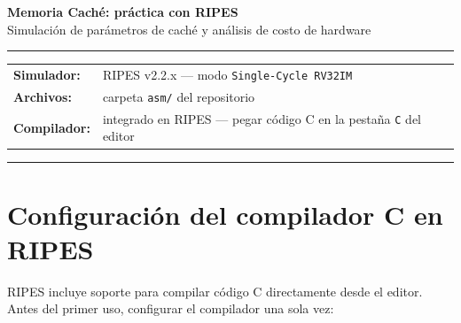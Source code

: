 \documentclass[12pt, a4paper]{article}
\begin{document}

\begin{center}
    {\LARGE\bfseries Memoria Caché: práctica con RIPES}\\[0.4cm]
    {\large Simulación de parámetros de caché y análisis de costo de hardware}\\[0.2cm]
    \rule{\textwidth}{1pt}
\end{center}

\vspace{0.3cm}
\begin{tabular}{ll}
    \textbf{Simulador:}   & RIPES v2.2.x — modo \texttt{Single-Cycle RV32IM} \\
    \textbf{Archivos:}    & carpeta \texttt{asm/} del repositorio \\
    \textbf{Compilador:}  & integrado en RIPES — pegar código C en la pestaña \texttt{C} del editor \\
\end{tabular}
\vspace{0.2cm}
\rule{\textwidth}{0.5pt}


\section*{Configuración del compilador C en RIPES}

RIPES incluye soporte para compilar código C directamente desde el editor.
Antes del primer uso, configurar el compilador una sola vez:
\end{document}
